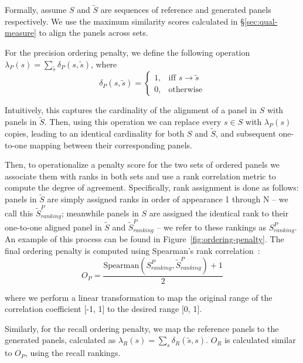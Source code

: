 Formally, assume $S$ and $\tilde{S}$  are sequences of reference and generated panels respectively. We use the maximum similarity scores calculated in \S\ref{sec:qual-measure} to align the panels across sets.

For the precision ordering penalty, we define the following operation $\lambda_P(s)=\sum_{\tilde{s}}\delta_P(s,\tilde{s})$, where
\[
    \delta_P(s,\tilde{s})= 
\begin{cases}
    1, & \text{iff } s \rightarrow \tilde{s}\\
    0, & \text{otherwise}
\end{cases}
\]


\noindent Intuitively, this captures the cardinality of the alignment of a panel in $S$ with panels in $\tilde{S}$. Then, using this operation we can replace every $s \in S$ with $\lambda_P(s)$ copies, leading to an identical cardinality for both $S$ and $\tilde{S}$, and subsequent one-to-one mapping between their corresponding panels.



Then, to operationalize a penalty score for the two sets of ordered panels we associate them with ranks in both sets and use a rank correlation metric to compute the degree of agreement. Specifically, rank assignment is done as follows: panels in $\tilde{S}$ are simply assigned ranks in order of appearance 1 through N -- we call this $\tilde{S}_{ranking}^P$; meanwhile panels in $S$ are assigned the identical rank to their one-to-one aligned panel in $\tilde{S}$ and $\tilde{S}_{ranking}^P$ -- we refer to these rankings as $S_{ranking}^P$.  An example of this process can be found in Figure~\ref{fig:ordering-penalty}. The final ordering penalty is computed using Spearman's rank correlation~\cite{5548399}:
\vspace{-0.5mm}
\begin{equation}
    O_P = \frac{\mathrm{Spearman}(S_{ranking}^P, \tilde{S}_{ranking}^P) + 1}{2}
\end{equation}

\noindent where we perform a linear transformation to map the original range of the correlation coefficient [-1, 1] to the desired range [0, 1].

Similarly, for the recall ordering penalty, we map the reference panels to the generated panels, calculated as $\lambda_R(s)=\sum_{s}\delta_R(\tilde{s}, s)$. $O_R$ is calculated similar to $O_P$, using the recall rankings.%

